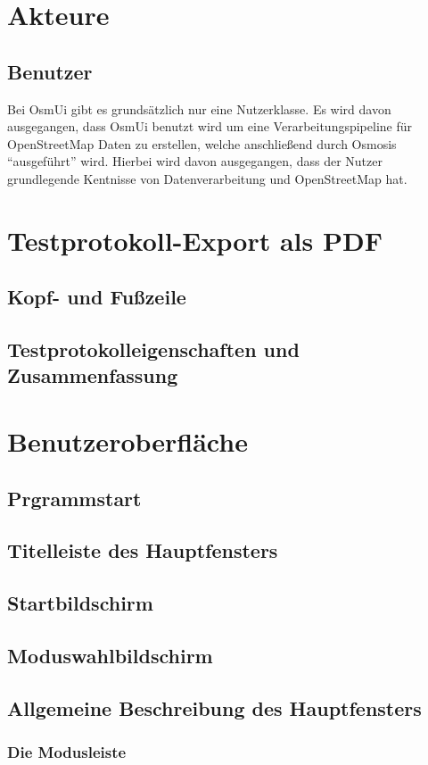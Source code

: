 \documentclass[a4paper,10pt]{scrartcl}
\begin{document}
\section{Akteure}
\subsection{Benutzer}
Bei OsmUi gibt es grundsätzlich nur eine Nutzerklasse. Es wird davon ausgegangen, dass OsmUi benutzt wird um eine Verarbeitungspipeline für OpenStreetMap Daten
zu erstellen, welche anschließend durch Osmosis ``ausgeführt'' wird. Hierbei wird davon ausgegangen, dass der Nutzer grundlegende Kentnisse 
von Datenverarbeitung und OpenStreetMap hat.

\section{Testprotokoll-Export als PDF}
\subsection{Kopf- und Fußzeile}
\subsection{Testprotokolleigenschaften und Zusammenfassung}

\section{Benutzeroberfläche}
\subsection{Prgrammstart}
\subsection{Titelleiste des Hauptfensters}
\subsection{Startbildschirm}
\subsection{Moduswahlbildschirm}
\subsection{Allgemeine Beschreibung des Hauptfensters}
\subsubsection{Die Modusleiste}
\end{document}

